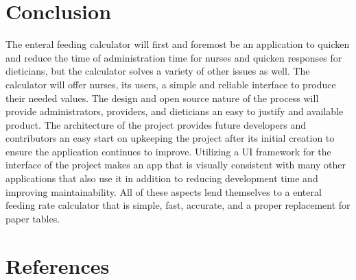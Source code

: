 \documentclass[onecolumn, draftclsnofoot,10pt, compsoc]{IEEEtran}
\begin{document}

\section{Conclusion}
The enteral feeding calculator will first and foremost be an application to quicken and reduce the time of administration time for nurses and quicken responses for dieticians, but the calculator solves a variety of other issues as well.
The calculator will offer nurses, its users, a simple and reliable interface to produce their needed values.
The design  and open source nature of the process will provide administrators, providers, and dieticians an easy to justify and available product.
The architecture of the project provides future developers and contributors an easy start on upkeeping the project after its initial creation to ensure the application continues to improve.
Utilizing a UI framework for the interface of the project makes an app that is visually consistent with many other applications that also use it in addition to reducing development time and improving maintainability.
All of these aspects lend themselves to a enteral feeding rate calculator that is simple, fast, accurate, and a proper replacement for paper tables.
\printbibliography[title=\section{References}]
\section{References}
\end{document}
